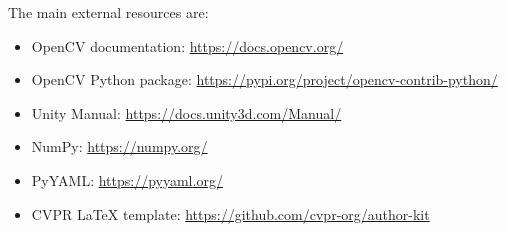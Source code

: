 \documentclass[10pt,twocolumn,letterpaper]{article}
\begin{document}
The main external resources are:
\begin{itemize}
    \item OpenCV documentation: \url{https://docs.opencv.org/}
    \item OpenCV Python package: \url{https://pypi.org/project/opencv-contrib-python/}
    \item Unity Manual: \url{https://docs.unity3d.com/Manual/}
    \item NumPy: \url{https://numpy.org/}
    \item PyYAML: \url{https://pyyaml.org/}
    \item CVPR LaTeX template: \url{https://github.com/cvpr-org/author-kit}
\end{itemize}

{\small


}
\end{document}
